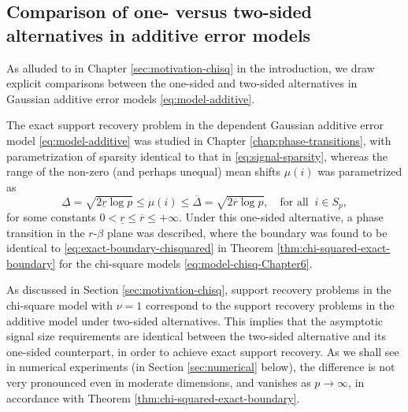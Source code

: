 \subsection{Comparison of one- versus two-sided alternatives in additive error models}
\label{subsec:one-vs-two-sided}


As alluded to in Chapter \ref{sec:motivation-chisq} in the introduction, we draw explicit comparisons between the one-sided and two-sided alternatives in Gaussian additive error models \eqref{eq:model-additive}.

The exact support recovery problem in the dependent Gaussian additive error model \eqref{eq:model-additive} was studied in Chapter \ref{chap:phase-transitions}, with parametrization of sparsity identical to that in \eqref{eq:signal-sparsity}, whereas the range of the non-zero (and perhaps unequal) mean shifts $\mu(i)$ was parametrized as 
\begin{equation*}
    \underline{\Delta} = \sqrt{2\underline{r}\log{p}}
    \le \mu(i) \le
    \overline{\Delta} = \sqrt{2\overline{r}\log{p}}, \quad \text{for all}\;\;i\in S_p,
\end{equation*}
for some constants $0<\underline{r}\le\overline{r}\le+\infty$.
Under this one-sided alternative, a phase transition in the $r$-$\beta$ plane was described, where the boundary was found to be identical to \eqref{eq:exact-boundary-chisquared} in Theorem \ref{thm:chi-squared-exact-boundary} for the chi-square models \eqref{eq:model-chisq-Chapter6}. 

As discussed in Section \ref{sec:motivation-chisq}, support recovery problems in the chi-square model with $\nu=1$ correspond to the support recovery problems in 
the additive model under two-sided alternatives. This implies that the asymptotic signal size requirements are identical between the two-sided alternative and its 
one-sided counterpart, in order to achieve exact support recovery. As we shall see in numerical experiments (in Section \ref{sec:numerical} below), the difference 
is not very pronounced even in moderate dimensions, and vanishes as $p\to\infty$, in accordance with Theorem \ref{thm:chi-squared-exact-boundary}.

\medskip

